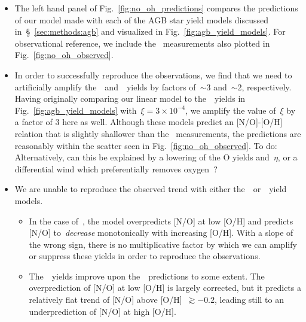 \documentclass[ms.tex]{subfiles}
\begin{document}
\begin{itemize}
	\item The left hand panel of Fig.~\ref{fig:no_oh_predictions} compares the 
	predictions of our model made with each of the AGB star yield models 
	discussed in~\S~\ref{sec:methods:agb} and visualized in 
	Fig.~\ref{fig:agb_yield_models}. 
	For observational reference, we include the~\citet{Dopita2016} measurements 
	also plotted in Fig.~\ref{fig:no_oh_observed}. 

	\item In order to successfully reproduce the observations, we find that we 
	need to artificially amplify the~\cristallo~and~\ventura~yields by factors 
	of~$\sim$3 and~$\sim$2, respectively. 
	Having originally comparing our linear model to the~\cristallo~yields in 
	Fig.~\ref{fig:agb_yield_models} with~$\xi = 3\times10^{-4}$, we amplify the 
	value of~$\xi$ by a factor of 3 here as well. 
	Although these models predict an [N/O]-[O/H] relation that is slightly 
	shallower than the~\citet{Dopita2016} measurements, the predictions are 
	reasonably within the scatter seen in Fig.~\ref{fig:no_oh_observed}. 
	{\color{red} To do: Alternatively, can this be explained by a lowering of 
	the O yields and~$\eta$, or a differential wind which preferentially 
	removes oxygen~\citep{Vincenzo2016}}? 

	\item We are unable to reproduce the observed trend with either 
	the~\karakasten~or~\karakas~yield models. 
	\begin{itemize} 
		\item In the case of~\karakasten, the model overpredicts [N/O] at low 
		[O/H] and predicts [N/O] to~\textit{decrease} monotonically with 
		increasing [O/H]. 
		With a slope of the wrong sign, there is no multiplicative factor by 
		which we can amplify or suppress these yields in order to reproduce the 
		observations. 

		\item The~\karakas~yields improve upon the~\karakasten~predictions to 
		some extent. 
		The overprediction of [N/O] at low [O/H] is largely corrected, but it 
		predicts a relatively flat trend of [N/O] above [O/H]~$\gtrsim -0.2$, 
		leading still to an underprediction of [N/O] at high [O/H]. 
	\end{itemize} 


\end{itemize}
\end{document}
